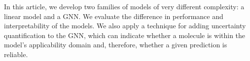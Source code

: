In this article, we develop two families of models of very different complexity: a linear model and a GNN. We evaluate the difference in performance and interpretability of the models. We also apply a technique for adding uncertainty
quantification to the GNN, which can indicate whether a molecule is within the model's applicability domain and, therefore, whether a given prediction is reliable.
